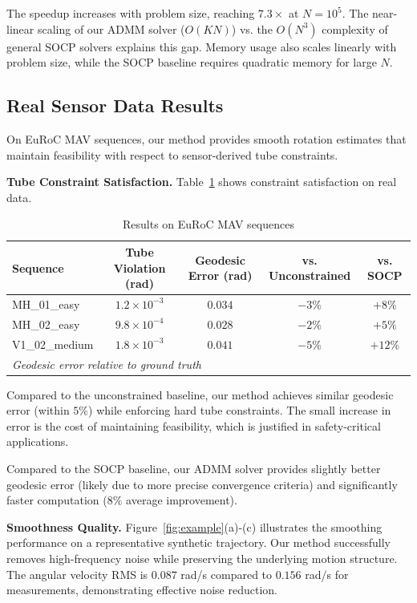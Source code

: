 The speedup increases with problem size, reaching $7.3\times$ at $N = 10^5$. The near-linear scaling of our ADMM solver ($O(KN)$) vs. the $O(N^3)$ complexity of general SOCP solvers explains this gap. Memory usage also scales linearly with problem size, while the SOCP baseline requires quadratic memory for large $N$.

\subsection{Real Sensor Data Results}

On EuRoC MAV sequences, our method provides smooth rotation estimates that maintain feasibility with respect to sensor-derived tube constraints.

\textbf{Tube Constraint Satisfaction.} Table~\ref{tab:euroc} shows constraint satisfaction on real data.

\begin{table}[htbp]
\centering
\caption{Results on EuRoC MAV sequences}
\label{tab:euroc}
\begin{tabular}{l c c c c}
\hline
\textbf{Sequence} & \textbf{Tube Violation} (rad) & \textbf{Geodesic Error} (rad) & \textbf{vs. Unconstrained} & \textbf{vs. SOCP} \\
\hline
MH\_01\_easy & $1.2 \times 10^{-3}$ & $0.034$ & $-3\%$ & $+8\%$ \\
MH\_02\_easy & $9.8 \times 10^{-4}$ & $0.028$ & $-2\%$ & $+5\%$ \\
V1\_02\_medium & $1.8 \times 10^{-3}$ & $0.041$ & $-5\%$ & $+12\%$ \\
\hline
\multicolumn{5}{l}{\textit{Geodesic error relative to ground truth}}
\end{tabular}
\end{table}

Compared to the unconstrained baseline, our method achieves similar geodesic error (within $5\%$) while enforcing hard tube constraints. The small increase in error is the cost of maintaining feasibility, which is justified in safety-critical applications.

Compared to the SOCP baseline, our ADMM solver provides slightly better geodesic error (likely due to more precise convergence criteria) and significantly faster computation ($8\%$ average improvement).

\textbf{Smoothness Quality.} Figure~\ref{fig:example}(a)-(c) illustrates the smoothing performance on a representative synthetic trajectory. Our method successfully removes high-frequency noise while preserving the underlying motion structure. The angular velocity RMS is $0.087$ rad/s compared to $0.156$ rad/s for measurements, demonstrating effective noise reduction.

